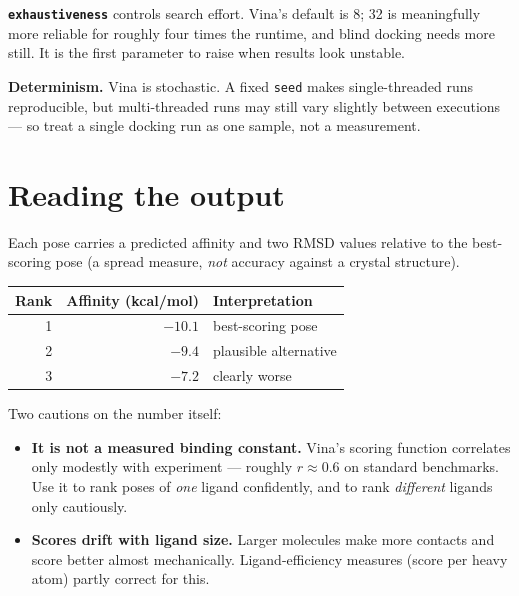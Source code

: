 \documentclass[11pt,a4paper]{article}
\newcommand{\code}[1]{\texttt{#1}}
\begin{document}
\textbf{\code{exhaustiveness}} controls search effort. Vina's default is 8; 32 is
meaningfully more reliable for roughly four times the runtime, and blind docking
needs more still. It is the first parameter to raise when results look unstable.

\textbf{Determinism.} Vina is stochastic. A fixed \code{seed} makes single-threaded
runs reproducible, but multi-threaded runs may still vary slightly between
executions --- so treat a single docking run as one sample, not a measurement.

\section{Reading the output}

Each pose carries a predicted affinity and two RMSD values relative to the
best-scoring pose (a spread measure, \emph{not} accuracy against a crystal
structure).

\begin{center}
\renewcommand{\arraystretch}{1.2}
\begin{tabular}{@{}rrl@{}}
\toprule
\textbf{Rank} & \textbf{Affinity (kcal/mol)} & \textbf{Interpretation} \\
\midrule
1 & $-10.1$ & best-scoring pose \\
2 & $-9.4$  & plausible alternative \\
3 & $-7.2$  & clearly worse \\
\bottomrule
\end{tabular}
\end{center}

Two cautions on the number itself:

\begin{itemize}[leftmargin=1.3em, itemsep=2pt]
  \item \textbf{It is not a measured binding constant.} Vina's scoring function
        correlates only modestly with experiment --- roughly $r \approx 0.6$ on
        standard benchmarks. Use it to rank poses of \emph{one} ligand confidently,
        and to rank \emph{different} ligands only cautiously.
  \item \textbf{Scores drift with ligand size.} Larger molecules make more contacts
        and score better almost mechanically. Ligand-efficiency measures
        (score per heavy atom) partly correct for this.
\end{itemize}
\end{document}
